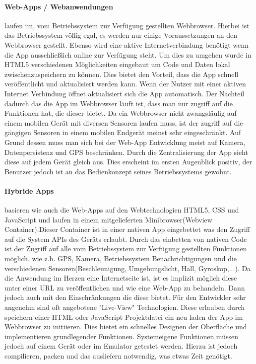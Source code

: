 \paragraph{Web-Apps / Webanwendungen}laufen im, vom Betriebssystem zur Verfügung gestellten Webbrowser. Hierbei ist das Betriebssystem völlig egal, es werden nur einige Voraussetzungen an den Webbrowser gestellt. Ebenso wird eine aktive Internetverbindung benötigt wenn die App ausschließlich online zur Verfügung steht. Um dies zu umgehen wurde in HTML5 verschiedenen Möglichkeiten eingebaut um Code und Daten lokal zwischenzuspeichern zu können. Dies bietet den Vorteil, dass die App schnell veröffentlicht und aktualisiert werden kann. Wenn der Nutzer mit einer aktiven Internet Verbindung öffnet aktualisiert sich die App automatisch. 
Der Nachteil dadurch das die App im Webbrowser läuft ist, dass man nur zugriff auf die Funktionen hat, die dieser bietet. Da ein Webbrowser nicht zwangsläufig auf einem mobilen Gerät mit diversen Sensoren laufen muss, ist der zugriff auf die gängigen Sensoren in einem mobilen Endgerät meinst sehr eingeschränkt. Auf Grund dessen muss man sich bei der Web-App Entwicklung meist auf Kamera, Datenpersistenz und GPS beschränken. Durch die Zentralisierung der App sieht diese auf jedem Gerät gleich aus. Dies erscheint im ersten Augenblick positiv, der Benutzer jedoch ist an das Bedienkonzept seines Betriebssystems gewohnt.


\paragraph{Hybride Apps} basieren wie auch die Web-Apps auf den Webtechnologien HTML5, CSS und JavaScript und laufen in einem mitgelieferten Minibrowser(Webview Container).Dieser Container ist in einer nativen App eingebettet was den Zugriff auf die System APIs des Geräts erlaubt. Durch das einbetten von nativen Code ist der Zugriff auf alle vom Betriebssystem zur Verfügung gestellten Funktionen möglich. wie z.b. GPS, Kamera, Betriebssystem Benachrichtigungen und die verschiedenen Sensoren(Beschleunigung, Umgebungslicht, Hall, Gyroskop,...). 
Da die Anwendung im Herzen eine Internetseite ist, ist es implizit möglich diese unter einer URL zu veröffentlichen und wie eine Web-App zu behandeln. Dann jedoch auch mit den Einschränkungen die diese bietet. Für den Entwickler sehr angenehm sind oft angebotene "Live-View" Technologien. Diese erlauben durch speichern einer HTML oder JavaScript Projektdatei ein neu laden der App im Webbrowser zu initiieren. Dies bietet ein schnelles Designen der Oberfläche und implementieren grundlegender Funktionen. Systemeigene Funktionen müssen jedoch auf einem Gerät oder im Emulator getestet werden. Hierzu ist jedoch compilieren, packen und das ausliefern notwendig, was etwas Zeit genötigt.


